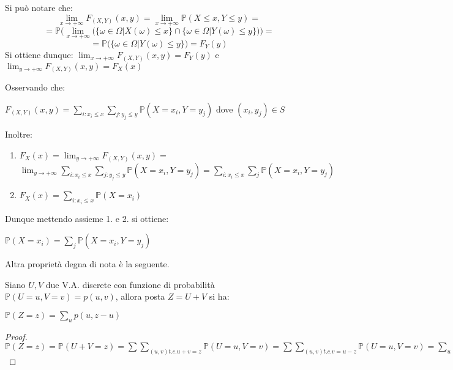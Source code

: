 \vspace{10px}

\begin{observation}
Si può notare che:
    \[\lim_{x\to+\infty}F_{(X,Y)}(x,y)=\lim_{x\to+\infty}\mathbb{P}(X\leq x, Y\leq y)=\]
    \[=\mathbb{P}\Big(\lim_{x\to+\infty}\big(\{\omega\in\Omega | X(\omega)\leq x\}\cap\{\omega\in\Omega | Y(\omega)\leq y\}\big)\Big)=\]
    \[=\mathbb{P}\big(\{\omega\in\Omega | Y(\omega)\leq y\}\big)=F_Y(y)\]
Si ottiene dunque: $\lim_{x\to+\infty}F_{(X,Y)}(x,y)=F_Y(y)$ e $\lim_{y\to+\infty}F_{(X,Y)}(x,y)=F_X(x)$
\end{observation}


\begin{observation}
Osservando che:
\begin{center}
    $F_{(X,Y)}(x,y)=\sum\limits_{i:x_i\leq x}\sum\limits_{j:y_j\leq y}\mathbb{P}(X=x_i, Y=y_j)$ \hspace{6px} dove $(x_i,y_j)\in S$
\end{center}
Inoltre:
\begin{enumerate}
    \item $F_X(x)=\lim_{y\to+\infty}F_{(X,Y)}(x,y)=$
    \vspace{3px}
    \newline
    $\lim_{y\to+\infty}\sum\limits_{i:x_i\leq x}\sum\limits_{j:y_j\leq y}\mathbb{P}(X=x_i, Y=y_j)=\sum\limits_{i:x_i\leq x}\sum\limits_j\mathbb{P}(X=x_i, Y=y_j)$
    \item $F_X(x)=\sum\limits_{i:x_i\leq x}\mathbb{P}(X=x_i)$
\end{enumerate}
Dunque mettendo assieme 1. e 2. si ottiene:
\begin{center}
    $\mathbb{P}(X=x_i)=\sum\limits_j\mathbb{P}(X=x_i,Y=y_j)$
\end{center}
\end{observation}

Altra proprietà degna di nota è la seguente.

\begin{proposition}
Siano $U,V$ due V.A. discrete con funzione di probabilità $\mathbb{P}(U=u,V=v)=p(u,v)$, allora posta $Z=U+V$ si ha: 
\begin{center}
    $\mathbb{P}(Z=z)=\sum\limits_{u}p(u,z-u)$
\end{center}
\begin{proof}
$\mathbb{P}(Z=z)=\mathbb{P}(U+V=z)=\sum\sum\limits_{(u,v) t.c. u+v=z}\mathbb{P}(U=u,V=v)=\sum\sum\limits_{(u,v) t.c. v=u-z}\mathbb{P}(U=u,V=v)=\sum\limits_{u}\mathbb{P}(U=u,V=z-u)$
\end{proof}
\end{proposition}